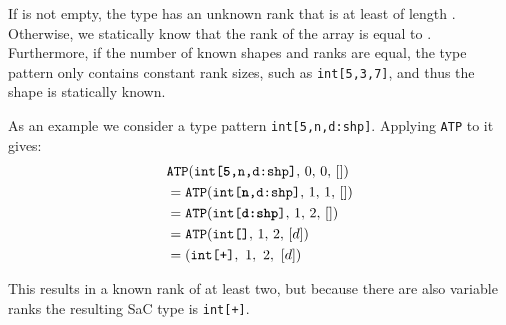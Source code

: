 \noindent
If \vdim{} is not empty, the type has an unknown rank that is at least of length \fdim{}.
Otherwise, we statically know that the rank of the array is equal to \fdim{}.
Furthermore, if the number of known shapes and ranks are equal, the type pattern only contains constant rank sizes, such as \texttt{int[5,3,7]}, and thus the shape is statically known.

As an example we consider a type pattern \texttt{int[5,n,d:shp]}.
Applying \texttt{ATP} to it gives:
\begin{align*}
    &\texttt{ATP}(\texttt{int[\textbf{5},n,d:shp]},\,0,\,0,\,[]) \\
    &= \texttt{ATP}(\texttt{int[\textbf{n},d:shp]},\,1,\,1,\,[]) \\
    &= \texttt{ATP}(\texttt{int[\textbf{d:shp}]},\,1,\,2,\,[]) \\
    &= \texttt{ATP}(\texttt{int[]},\,1,\,2,\,[d]) \\
    &= (\texttt{int[+]},\ 1,\ 2,\ [d])
\end{align*}

\noindent
This results in a known rank of at least two, but because there are also variable ranks the resulting SaC type is \texttt{int[+]}.
